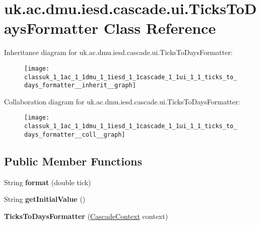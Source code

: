 \hypertarget{classuk_1_1ac_1_1dmu_1_1iesd_1_1cascade_1_1ui_1_1_ticks_to_days_formatter}{\section{uk.\-ac.\-dmu.\-iesd.\-cascade.\-ui.\-Ticks\-To\-Days\-Formatter Class Reference}
\label{classuk_1_1ac_1_1dmu_1_1iesd_1_1cascade_1_1ui_1_1_ticks_to_days_formatter}
}


Inheritance diagram for uk.\-ac.\-dmu.\-iesd.\-cascade.\-ui.\-Ticks\-To\-Days\-Formatter\-:\nopagebreak
\begin{figure}[H]
\begin{center}
\leavevmode
\texttt{[image: classuk\_1\_1ac\_1\_1dmu\_1\_1iesd\_1\_1cascade\_1\_1ui\_1\_1\_ticks\_to\_days\_formatter\_\_inherit\_\_graph]}
\end{center}
\end{figure}


Collaboration diagram for uk.\-ac.\-dmu.\-iesd.\-cascade.\-ui.\-Ticks\-To\-Days\-Formatter\-:\nopagebreak
\begin{figure}[H]
\begin{center}
\leavevmode
\texttt{[image: classuk\_1\_1ac\_1\_1dmu\_1\_1iesd\_1\_1cascade\_1\_1ui\_1\_1\_ticks\_to\_days\_formatter\_\_coll\_\_graph]}
\end{center}
\end{figure}
\subsection*{Public Member Functions}
\begin{DoxyCompactItemize}
\item 
\hypertarget{classuk_1_1ac_1_1dmu_1_1iesd_1_1cascade_1_1ui_1_1_ticks_to_days_formatter_aeb31f9bca9077ac09a4cbf22b4f2a86c}{String {\bfseries format} (double tick)}\label{classuk_1_1ac_1_1dmu_1_1iesd_1_1cascade_1_1ui_1_1_ticks_to_days_formatter_aeb31f9bca9077ac09a4cbf22b4f2a86c}

\item 
\hypertarget{classuk_1_1ac_1_1dmu_1_1iesd_1_1cascade_1_1ui_1_1_ticks_to_days_formatter_a71717681d1581e5b54689753e1b569e7}{String {\bfseries get\-Initial\-Value} ()}\label{classuk_1_1ac_1_1dmu_1_1iesd_1_1cascade_1_1ui_1_1_ticks_to_days_formatter_a71717681d1581e5b54689753e1b569e7}

\item 
\hypertarget{classuk_1_1ac_1_1dmu_1_1iesd_1_1cascade_1_1ui_1_1_ticks_to_days_formatter_a7d07b82f58abedd5d79b4e01833d03db}{{\bfseries Ticks\-To\-Days\-Formatter} (\hyperlink{classuk_1_1ac_1_1dmu_1_1iesd_1_1cascade_1_1context_1_1_cascade_context}{Cascade\-Context} context)}\label{classuk_1_1ac_1_1dmu_1_1iesd_1_1cascade_1_1ui_1_1_ticks_to_days_formatter_a7d07b82f58abedd5d79b4e01833d03db}

\end{DoxyCompactItemize}


